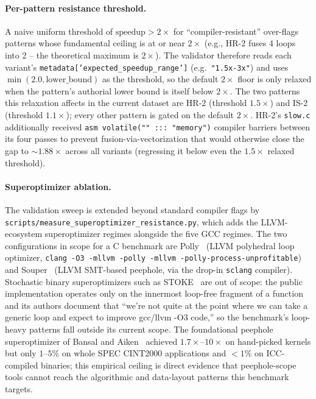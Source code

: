 \paragraph{Per-pattern resistance threshold.} A naive uniform threshold of $\text{speedup} > 2\times$ for ``compiler-resistant'' over-flags patterns whose fundamental ceiling is at or near $2\times$ (e.g., HR-2 fuses 4 loops into 2 -- the theoretical maximum is $2\times$). The validator therefore reads each variant's \texttt{metadata['expected\_speedup\_range']} (e.g.\ \texttt{"1.5x-3x"}) and uses $\min(2.0, \text{lower\_bound})$ as the threshold, so the default $2\times$ floor is only relaxed when the pattern's authorial lower bound is itself below $2\times$. The two patterns this relaxation affects in the current dataset are HR-2 (threshold $1.5\times$) and IS-2 (threshold $1.1\times$); every other pattern is gated on the default $2\times$. HR-2's \texttt{slow.c} additionally received \texttt{asm volatile("" ::: "memory")} compiler barriers between its four passes to prevent fusion-via-vectorization that would otherwise close the gap to $\sim\!1.88\times$ across all variants (regressing it below even the $1.5\times$ relaxed threshold).

\paragraph{Superoptimizer ablation.} The validation sweep is extended beyond standard compiler flags by \texttt{scripts/measure\_superoptimizer\_resistance.py}, which adds the LLVM-ecosystem superoptimizer regimes alongside the five GCC regimes. The two configurations in scope for a C benchmark are Polly~\cite{grosser2012polly} (LLVM polyhedral loop optimizer, \texttt{clang -O3 -mllvm -polly -mllvm -polly-process-unprofitable}) and Souper~\cite{sasnauskas2017souper} (LLVM SMT-based peephole, via the drop-in \texttt{sclang} compiler). Stochastic binary superoptimizers such as STOKE~\cite{schkufza2013stoke} are out of scope: the public implementation operates only on the innermost loop-free fragment of a function and its authors document that ``we're not quite at the point where we can take a generic loop and expect to improve gcc/llvm -O3 code,'' so the benchmark's loop-heavy patterns fall outside its current scope. The foundational peephole superoptimizer of Bansal and Aiken~\cite{bansal2006gso} achieved $1.7\times$--$10\times$ on hand-picked kernels but only $1$--$5\%$ on whole SPEC CINT2000 applications and $<1\%$ on ICC-compiled binaries; this empirical ceiling is direct evidence that peephole-scope tools cannot reach the algorithmic and data-layout patterns this benchmark targets.

